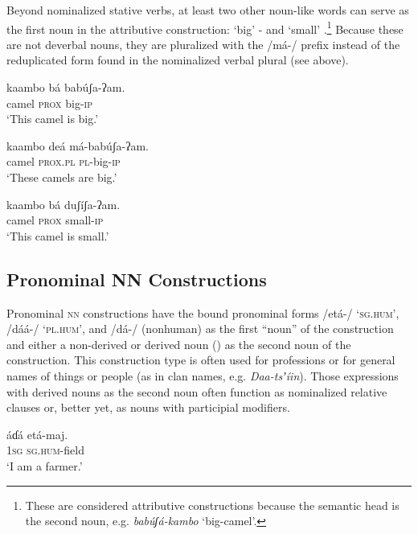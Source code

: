 \documentclass[output=paper]{langsci/langscibook}
\begin{document}
Beyond nominalized stative verbs, at least two other noun-like words can serve as the first noun in the attributive construction: ‘big’ - and ‘small’ .\footnote{These are considered attributive constructions because the semantic head is the second noun, e.g. \textit{bab\'{u}ʃá-kambo} ‘big-camel’.} Because these are not deverbal nouns, they are pluralized with the /má-/ prefix  instead of the reduplicated form found in the nominalized verbal plural (see  above).

\ea\label{ex:ahlandc:52}
\gll
kaambo bá      bab\'{u}ʃa-ʔam.  \\
camel    \textsc{prox}  big-\textsc{ip} \\
\glt
‘This camel is big.’
\z

\ea\label{ex:ahlandc:53}
\gll
kaambo deá          má-bab\'{u}ʃa-ʔam.   \\
camel    \textsc{prox.pl}  \textsc{pl-}big\textsc{{}-ip} \\
\glt
‘These camels are big.’
\z

\ea\label{ex:ahlandc:54}
\gll
kaambo bá  duʃíʃa-ʔam.  \\
camel    \textsc{prox}  small-\textsc{ip} \\
\glt
‘This camel is small.’
\z

\subsection{Pronominal NN Constructions}\label{sec:ahlandc:8.3}

Pronominal \textsc{nn} constructions 
have the bound pronominal forms \mbox{/etá-/} ‘\textsc{sg.hum}’, /dáá-/ ‘\textsc{pl.hum}’, and /dá-/ (nonhuman) as the first “noun” of the construction and either a non-derived  or derived noun () as the second noun of the construction. This construction type is often used for professions  or for general names of things or people (as in clan names, e.g. \textit{Daa-ts}\textit{ʼíin}).   Those expressions with derived nouns as the second noun often function as nominalized relative clauses or, better yet, as nouns with participial modifiers. 

\ea\label{ex:ahlandc:55}
\ea\label{ex:ahlandc:55a}
\gll
áɗá  etá-maj.   \\
  \textsc{1sg}  \textsc{sg.hum}{}-field\\
\glt
  ‘I am a farmer.’
\end{document}
